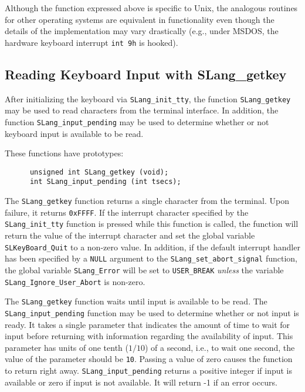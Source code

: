   Although the function expressed above is specific to Unix, the
  analogous routines for other operating systems are equivalent in
  functionality even though the details of the implementation may vary
  drastically (e.g., under MSDOS, the hardware keyboard interrupt
  \verb|int 9h| is hooked).


\subsection{Reading Keyboard Input with SLang\_getkey} %

  After initializing the keyboard via \verb|SLang_init_tty|,
  the \slang{} function \verb|SLang_getkey| may be used to read
  characters from the terminal interface.  In addition, the function
  \verb|SLang_input_pending| may be used to determine whether or not
  keyboard input is available to be read.

  These functions have prototypes:
\begin{verbatim}   
      unsigned int SLang_getkey (void);
      int SLang_input_pending (int tsecs);
\end{verbatim}
  The \verb|SLang_getkey| function returns a single character from the
  terminal.  Upon failure, it returns \verb|0xFFFF|.  If the interrupt
  character specified by the \verb|SLang_init_tty| function is pressed
  while this function is called, the function will return the value of the
  interrupt character and set the \slang{} global variable
  \verb|SLKeyBoard_Quit| to a non-zero value.  In addition, if the default
  \slang{} interrupt handler has been specified by a \verb|NULL| argument to
  the \verb|SLang_set_abort_signal| function, the global variable
  \verb|SLang_Error| will be set to \verb|USER_BREAK| {\em unless} the
  variable \verb|SLang_Ignore_User_Abort| is non-zero.

  The \verb|SLang_getkey| function waits until input is available to be
  read.  The \verb|SLang_input_pending| function may be used to determine
  whether or not input is ready.  It takes a single parameter that indicates
  the amount of time to wait for input before returning with information
  regarding the availability of input.  This parameter has units of one
  tenth ($1/10$) of a second, i.e., to wait one second, the value of the
  parameter should be {\tt 10}.  Passing a value of zero causes the function
  to return right away.  \verb|SLang_input_pending| returns a positive
  integer if input is available or zero if input is not available.  It will
  return -1 if an error occurs.

